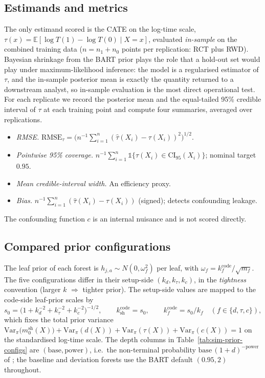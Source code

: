 \documentclass[11pt]{article}
\theoremstyle{plain}
\theoremstyle{definition}
\theoremstyle{remark}
\newcommand{\E}{\mathbb{E}}
\newcommand{\1}{\mathds{1}}
\newcommand{\Var}{\mathrm{Var}}
\begin{document}
\subsection{Estimands and metrics}
\label{sec:sim-prior-metrics}

The only estimand scored is the CATE on the log-time scale,
$\tau(x) = \E[\log T(1) - \log T(0) \mid X = x]$, evaluated
\emph{in-sample} on the combined training data
($n = n_1 + n_0$ points per replication: RCT plus RWD).  Bayesian shrinkage
from the BART prior plays the role that a hold-out set would play under
maximum-likelihood inference: the model is a regularised estimator of
$\tau$, and the in-sample posterior mean is exactly the quantity returned
to a downstream analyst, so in-sample evaluation is the most direct
operational test.  For each replicate we record the posterior mean and
the equal-tailed 95\% credible interval of $\tau$ at each training point
and compute four summaries, averaged over replications.
\begin{itemize}
  \item \emph{RMSE.}
    $\mathrm{RMSE}_\tau = \big( n^{-1} \sum_{i=1}^{n} (\hat\tau(X_i) - \tau(X_i))^2 \big)^{1/2}$.
  \item \emph{Pointwise 95\% coverage.}
    $n^{-1} \sum_{i=1}^{n} \1\{\tau(X_i) \in \mathrm{CI}_{95}(X_i)\}$;
    nominal target $0.95$.
  \item \emph{Mean credible-interval width.} An efficiency proxy.
  \item \emph{Bias.}
    $n^{-1} \sum_{i=1}^{n} (\hat\tau(X_i) - \tau(X_i))$ (signed);
    detects confounding leakage.
\end{itemize}
The confounding function $c$ is an internal nuisance and is not scored
directly.

\subsection{Compared prior configurations}
\label{sec:sim-prior-configs}

The leaf prior of each forest is $h_{j,a} \sim N(0, \omega_f^2)$ per leaf,
with $\omega_f = k_f^{\mathrm{code}} / \sqrt{m_f}$. The five configurations
differ in their setup-side $(k_d, k_\tau, k_c)$, in the \emph{tightness}
convention (larger $k$ $\Rightarrow$ tighter prior). The setup-side values
are mapped to the code-side leaf-prior scales by
\[
  s_0 = \bigl(1 + k_d^{-2} + k_\tau^{-2} + k_c^{-2}\bigr)^{-1/2},
  \qquad
  k_{\mathrm{sh}}^{\mathrm{code}} = s_0,
  \qquad
  k_f^{\mathrm{code}} = s_0 / k_f \quad (f \in \{d, \tau, c\}),
\]
which fixes the total prior variance
$\Var_\pi\bigl(m_0^{\mathrm{sh}}(X)\bigr) + \Var_\pi(d(X)) + \Var_\pi(\tau(X)) + \Var_\pi(c(X)) = 1$
on the standardised log-time scale. The depth columns in
Table~\ref{tab:sim-prior-configs} are $(\mathrm{base}, \mathrm{power})$,
i.e.\ the non-terminal probability $\mathrm{base}\,(1+d)^{-\mathrm{power}}$
of \citet{chipman1998bayesian}; the baseline and deviation forests use the
BART default $(0.95, 2)$ throughout.
\end{document}
